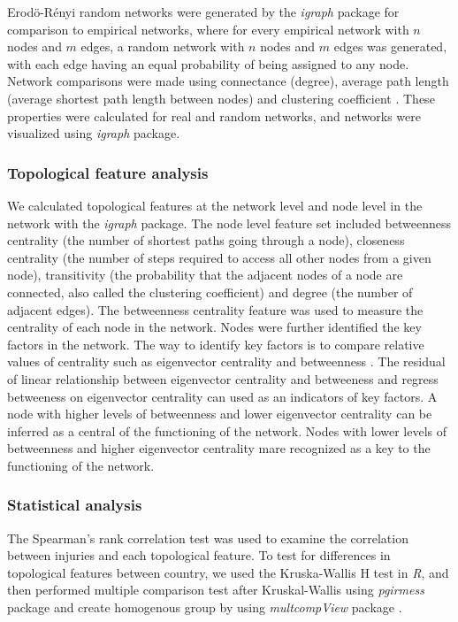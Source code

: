 Erod\"{o}-R\'{e}nyi random networks were generated by the \textit{igraph} package for comparison to empirical networks, where for every empirical network with $n$ nodes and $m$ edges, a random network with $n$ nodes and $m$ edges was generated, with each edge having an equal probability of being assigned to any node. Network comparisons were made using connectance (degree),  average path length (average shortest path length between nodes) and clustering coefficient \citep{Kolaczyk_2014_Statistical}. These properties were calculated for real and random networks, and networks were visualized using \textit{igraph} package. 

\subsubsection{Topological feature analysis}

We calculated topological features at the network level and node level in the network with the \textit{igraph} package. The node level feature set included betweenness centrality (the number of shortest paths going through a node), closeness centrality (the number of steps required to access all other nodes from a given node), transitivity (the probability that the adjacent nodes of a node are connected, also called the clustering coefficient) and degree (the number of adjacent edges). The betweenness centrality feature was used to measure the centrality of each node in the network. Nodes were further identified the key factors in the network. The way to identify key factors is to compare relative values of centrality such as eigenvector centrality and betweenness \cite{Valente_2008_How}. The residual of linear relationship between eigenvector centrality and betweeness and regress betweeness on eigenvector centrality can used as an indicators of key factors. A node with higher levels of betweenness and lower eigenvector centrality can be inferred as a central of the functioning of the network. Nodes with lower levels of betweenness and higher eigenvector centrality mare recognized as a key to the functioning of the network. 
 
\subsubsection{Statistical analysis}
The Spearman’s rank correlation test was used to examine the correlation between injuries and each topological feature.  To test for differences in topological features between country, we used the Kruska-Wallis H test in \textit{R}, and then performed multiple comparison test after Kruskal-Wallis using \textit{pgirmess} package \citep{Giraudoux_2012_pgirmess} and create homogenous group by using \textit{multcompView} package \citep{Spencer_2015_multcompView}.


